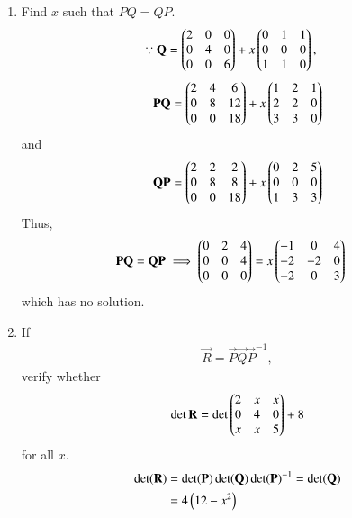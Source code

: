 \documentclass[journal,12pt,twocolumn]{IEEEtran}
\renewcommand\thesection{\arabic{section}}
\begin{document}
\begin{enumerate}[label=\thesection.\arabic*
,ref=\thesection.\theenumi]

\item Find $x$ such that $PQ=QP$.
%
\\
\solution 
\begin{align}
\because \mathbf{Q} &= \begin{pmatrix}2 & 0 & 0 \\ 0 & 4 & 0 \\ 0 & 0 & 6\end{pmatrix} +x\begin{pmatrix}0 & 1 & 1 \\ 0 & 0 & 0 \\ 1 & 1 & 0\end{pmatrix}, 
\end{align}
\begin{align}
\mathbf{P}\mathbf{Q} = 
 \begin{pmatrix}2 & 4 & 6 \\ 0 & 8 & 12 \\ 0 & 0 & 18\end{pmatrix}+x\begin{pmatrix}1 & 2 & 1 \\ 2 & 2 & 0 \\ 3 & 3 & 0\end{pmatrix}
\end{align}
and 
\begin{multline}
\mathbf{Q}\mathbf{P} = 
\begin{pmatrix}2 & 2 & 2 \\ 0 & 8 & 8 \\ 0 & 0 & 18\end{pmatrix}+x\begin{pmatrix}0 & 2 & 5 \\ 0 & 0 & 0 \\ 1 & 3 & 3\end{pmatrix} 
\end{multline}
%
Thus, 
\begin{align}
\mathbf{P}\mathbf{Q} = \mathbf{Q}\mathbf{P} 
\implies 
\begin{pmatrix}0 & 2 & 4 \\ 0 & 0 & 4 \\ 0 & 0 & 0\end{pmatrix} &= x\begin{pmatrix}-1 & 0 & 4 \\ -2 & -2 & 0 \\ -2 & 0 & 3\end{pmatrix}
\end{align}
which has no solution.
\item If 
\begin{align}
\vec{R} = \vec{P}\vec{Q}\vec{P}^{-1},
\end{align}
verify whether 
\begin{align}
\det{\mathbf{R}}= 
\det\begin{pmatrix}2 & x & x \\ 0 & 4 & 0 \\ x & x & 5\end{pmatrix} + 8
\end{align}
for all $x$.
\\
\solution 
\begin{align}
\det(\mathbf{R}) &= \det(\mathbf{P})\det(\mathbf{Q})\det(\mathbf{P})^{-1}=\det(\mathbf{Q})
\nonumber \\
&= 4\left(12-x^2\right)
\end{align}

\end{enumerate}
\end{document}
